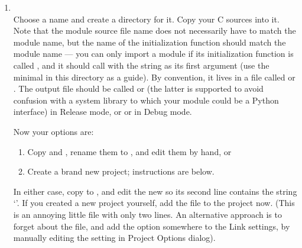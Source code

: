 \begin{enumerate}
\begin{verbatim}
C>..\..\PCbuild\python_d
Adding parser accelerators ...
Done.
Python 2.2 (#28, Dec 19 2001, 23:26:37) [MSC 32 bit (Intel)] on win32
Type "copyright", "credits" or "license" for more information.
>>> import example
[4897 refs]
>>> example.foo()
Hello, world
[4903 refs]
>>>
\end{verbatim}

    Congratulations!  You've successfully built your first Python
    extension module.

  \item
  \\
    Choose a name and create a directory for it.  Copy your C sources
    into it.  Note that the module source file name does not
    necessarily have to match the module name, but the name of the
    initialization function should match the module name --- you can
    only import a module  if its initialization function
    is called , and it should call
     with the string  as its
    first argument (use the minimal  in this directory
    as a guide).  By convention, it lives in a file called
     or .  The output file should be
    called  or  (the latter is supported
    to avoid confusion with a system library  to which
    your module could be a Python interface) in Release mode, or
     or  in Debug mode.

    Now your options are:

    \begin{enumerate}
      \item  Copy  and , rename
             them to , and edit them by hand, or
      \item  Create a brand new project; instructions are below.
    \end{enumerate}

    In either case, copy 
    to , and edit the new
     so its second line contains the string
    `'.  If you created a new project yourself, add the
    file  to the project now.  (This is an annoying
    little file with only two lines.  An alternative approach is to
    forget about the  file, and add the option
     somewhere to the Link settings, by
    manually editing the setting in Project Options dialog).


\end{enumerate}
